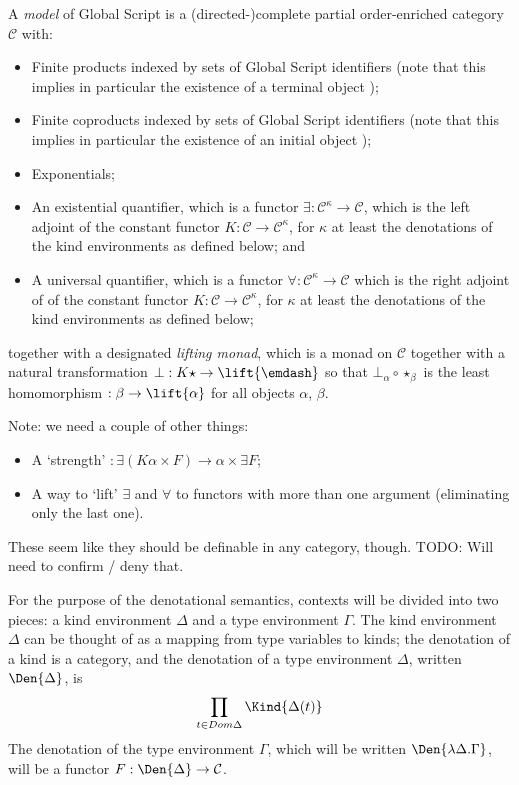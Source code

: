 \documentclass{report}
\newcommand\defn[1]{\emph{#1}}
\begin{document}
A \defn{model} of Global Script is a (directed-)complete partial order-enriched category $\mathcal{C}$ with:
\begin{itemize}
    \item Finite products indexed by sets of Global Script identifiers (note that this implies in particular the existence of a terminal object \<\star\>);
    \item Finite coproducts indexed by sets of Global Script identifiers (note that this implies in particular the existence of an initial object \<\epsilon\>);
    \item Exponentials;
    \item An existential quantifier, which is a functor $\exists : \mathcal{C}^\kappa \to \mathcal{C}$, which is the left adjoint of the constant functor $K : \mathcal{C} \to \mathcal{C}^\kappa$, for $\kappa$ at least the denotations of the kind environments as defined below; and
    \item A universal quantifier, which is a functor $\forall : \mathcal{C}^\kappa \to \mathcal{C}$ which is the right adjoint of of the constant functor $K : \mathcal{C} \to \mathcal{C}^\kappa$, for $\kappa$ at least the denotations of the kind environments as defined below;
\end{itemize}
together with a designated \defn{lifting monad}, which is a monad \<\lift{\emdash}\> on $\mathcal{C}$ together with a natural transformation $\bot : K\star \to \lift{\emdash}$ so that $\bot_\alpha \circ \star_\beta$ is the least homomorphism $: \beta \to \lift{\alpha}$ for all objects $\alpha$, $\beta$.

Note: we need a couple of other things:
\begin{itemize}
    \item A `strength' $: \exists (K\alpha \times F) \to \alpha \times \exists F$;
    \item A way to `lift' $\exists$ and $\forall$ to functors with more than one argument (eliminating only the last one).
\end{itemize}
These seem like they should be definable in any category, though.
TODO: Will need to confirm / deny that.

For the purpose of the denotational semantics, contexts will be divided into two pieces:
a kind environment $\Delta$ and a type environment $\Gamma$.
The kind environment $\Delta$ can be thought of as a mapping from type variables to kinds;
the denotation of a kind is a category, and the denotation of a type environment $\Delta$, written $\Den{\Delta}$, is
\begin{displaymath}
    \prod_{t\in Dom\Delta}\Kind{\Delta(t)}
\end{displaymath}
The denotation of the type environment $\Gamma$, which will be written $\Den{\lambda\Delta.\Gamma}$, will be a functor $F : \Den{\Delta} \to \mathcal{C}$.
\end{document}
